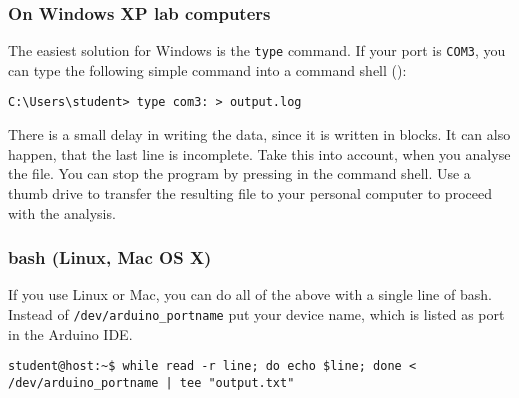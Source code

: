 \subsubsection{On Windows XP lab computers}
The easiest solution for Windows is the \texttt{type} command. 
If your port is \texttt{COM3}, you can type the following simple command into a command shell ():
%
\mdfsetgrey
\begin{verbatim}
C:\Users\student> type com3: > output.log
\end{verbatim}
%
There is a small delay in writing the data, since it is written in blocks. It can also happen, that the last line is incomplete. Take this into account, when you analyse the file. You can stop the program by pressing  in the command shell. Use a thumb drive to transfer the resulting file to your personal computer to proceed with the analysis.
%
\subsubsection{bash (Linux, Mac OS X)}
If you use Linux or Mac, you can do all of the above with a single line of bash. Instead of \texttt{/dev/arduino_portname} put your device name, which is listed as port in the Arduino \ac{IDE}.\par
%
\begin{verbatim}
student@host:~$ while read -r line; do echo $line; done < /dev/arduino_portname | tee "output.txt"
\end{verbatim}
%
